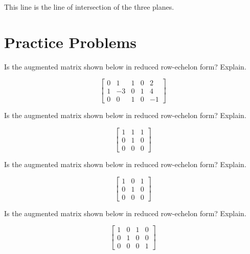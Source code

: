 \documentclass{ximera}
\begin{document}
\begin{example}
\begin{explanation}
  This line is the line of intersection of the three planes.
 \end{explanation}
 \end{example}

\section*{Practice Problems}

  \begin{problem}\label{prob:rrefmultchoice1}
Is the augmented matrix shown below in reduced row-echelon form?  Explain.
  
  $$\left[\begin{array}{cccc|c}  
 0&1&1&0&2\\1&-3&0&1&4\\0&0&1&0&-1
 \end{array}\right]$$
 \begin{multipleChoice}
 \end{multipleChoice}
  \end{problem}
  
   \begin{problem}\label{prob:rrefmultchoice2}
Is the augmented matrix shown below in reduced row-echelon form?  Explain.
   
  $$\left[\begin{array}{cc|c}  
 1&1&1\\0&1&0\\0&0&0
 \end{array}\right]$$
 \begin{multipleChoice}
 \end{multipleChoice}
  \end{problem}
  
  \begin{problem}\label{prob:rrefmultchoice3}
Is the augmented matrix shown below in reduced row-echelon form?  Explain.
  
  $$\left[\begin{array}{cc|c}  
 1&0&1\\0&1&0\\0&0&0
 \end{array}\right]$$
 \begin{multipleChoice}
 \end{multipleChoice}
  \end{problem}
  
  \begin{problem}\label{prob:rrefmultchoice4}
Is the augmented matrix shown below in reduced row-echelon form?  Explain.
  
  $$\left[\begin{array}{ccc|c}  
 1&0&1&0\\0&1&0&0\\0&0&0&1
 \end{array}\right]$$
 \begin{multipleChoice}
 \end{multipleChoice}
  \end{problem}
  
\end{document}

